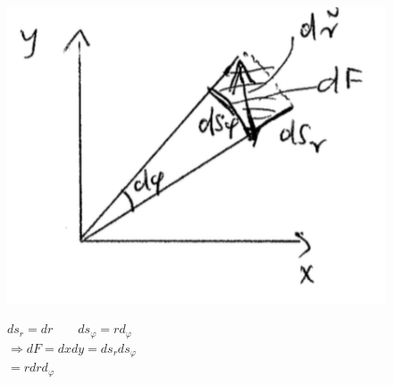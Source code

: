 \documentclass[11pt]{article}
\begin{document}
								\begin{figure}[htbp]
									\begin{minipage}[t]{10cm}
										\vspace{0pt}
										\centering
										\includegraphics[scale=0.5]{screenshot002.png}
									\end{minipage}
									\hfill
									\begin{minipage}[t]{10cm}
										\vspace{0pt}
										$ ds_r = dr \qquad ds_\varphi = r d_\varphi $\\
										$ \Rightarrow dF = dxdy = ds_r ds_\varphi $\\
										$ = rdrd_\varphi $
									\end{minipage}
								\end{figure}
\end{document}
